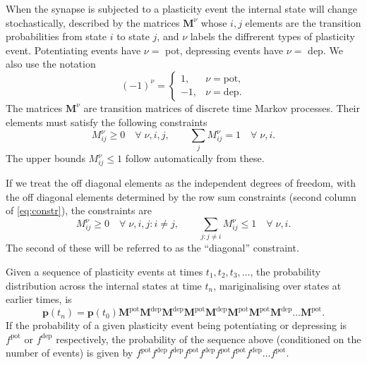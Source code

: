 \documentclass[12pt]{article}
\newcommand{\prm}{p}
\newcommand{\pr}{\mathbf{\prm}}
\newcommand{\MMdm}{M}
\newcommand{\MMd}{\mathbf{\MMdm}}
\newcommand{\pot}{^{\text{pot}}}
\newcommand{\dep}{^{\text{dep}}}
\begin{document}
When the synapse is subjected to a plasticity event the internal state will change stochastically, described by the matrices \(\MMd^\nu\) whose \(i,j\) elements are the transition probabilities from state \(i\) to state \(j\), 
and \(\nu \) labels the diffrerent types of plasticity event.
Potentiating events have \(\nu=\) pot, depressing events have \(\nu=\) dep.
We also use the notation
%
\begin{equation*}
  (-1)^\nu = 
    \begin{cases}
       1, & \nu = \text{pot}, \\
      -1, & \nu = \text{dep}.
    \end{cases}
\end{equation*}
%
The matrices \(\MMd^\nu\) are transition matrices of discrete time Markov processes.
Their elements must satisfy the following constraints
%
\begin{equation}\label{eq:constr}
  \MMdm^\nu_{ij} \geq 0 
    \quad \forall \; \nu, i, j, \qquad
  \sum_j \MMdm^\nu_{ij} = 1
    \quad \forall \; \nu, i.
\end{equation}
%
The upper bounds \(\MMdm^\nu_{ij} \leq 1\) follow automatically from these.

If we treat the off diagonal elements as the independent degrees of freedom, with the off diagonal elements determined by the row sum constraints (second column of \eqref{eq:constr}), the constraints are
%
\begin{equation}\label{eq:constri}
  \MMdm^\nu_{i j} \geq 0
    \quad \forall \; \nu, i, j : i \neq j, \qquad
  \sum_{j : j\neq i} \MMdm^\nu_{ij} \leq 1
    \quad \forall \; \nu, i.
\end{equation}
%
The second of these will be referred to as the ``diagonal'' constraint.

Given a sequence of plasticity events at times \(t_1,t_2,t_3,\ldots\), the probability distribution across the internal states at time \(t_n\), 
mariginalising over states at earlier times, is
%
\begin{equation}\label{eq:plastseq}
  \pr(t_n) = \pr(t_0)  \MMd \pot \MMd \dep \MMd \dep \MMd \pot \MMd \dep \MMd \pot \MMd \pot \MMd \dep \ldots \MMd \pot .
\end{equation}
%
If the probability of a given plasticity event being potentiating or depressing is \(f\pot\) or \(f\dep\) respectively, the probability of the sequence above (conditioned on the number of events) is given by \(f\pot f\dep f\dep f\pot f\dep f\pot f\pot f\dep \ldots f\pot\).
\end{document}
